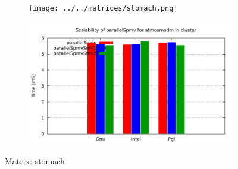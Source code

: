 \begin{figure} [ht!]
    \centering
    \captionsetup{justification=centering, singlelinecheck=false}
    \begin{subfigure}{.65\textwidth}
      \centering
      \hspace*{-3.5cm} 
      \texttt{[image: ../../matrices/stomach.png]}
      \label{fig:stomach_matrix}
    \end{subfigure}%
    \begin{subfigure}{.65\textwidth}
      \centering
      \hspace*{-6.0cm} 
      \includegraphics[page=8, width=0.95\linewidth]{../plots/myCluster_4-2.pdf}
      \label{fig:stomach_performance}
    \end{subfigure}
\caption{Matrix: stomach}
\label{fig:stomach}
\end{figure}

